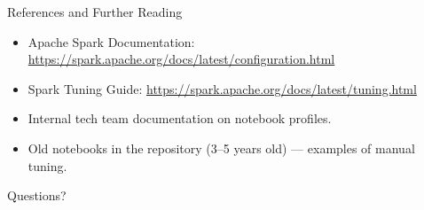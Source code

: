 \documentclass[aspectratio=169]{beamer}
\begin{document}
	\begin{frame}{References and Further Reading}
		\begin{itemize}
			\item Apache Spark Documentation: \url{https://spark.apache.org/docs/latest/configuration.html}
			\item Spark Tuning Guide: \url{https://spark.apache.org/docs/latest/tuning.html}
			\item Internal tech team documentation on notebook profiles.
			\item Old notebooks in the repository (3--5 years old) --- examples of manual tuning.
		\end{itemize}
		
		\vspace{1em}
		\begin{center}
			\Large Questions?
		\end{center}
	\end{frame}
	
\end{document}
